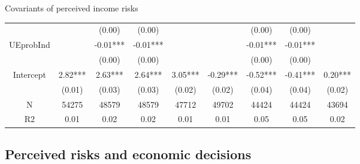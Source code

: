 \documentclass{beamer}
\begin{document}
\begin{frame}{Covariants of perceived income risks}
\begin{table}
{\begin{tabular}{ccccccccc}
	&           &    (0.00) &     (0.00) &             &           &     (0.00) &      (0.00) &              \\
	UEprobInd        &           &  -0.01*** &   -0.01*** &             &           &   -0.01*** &    -0.01*** &              \\
	&           &    (0.00) &     (0.00) &             &           &     (0.00) &      (0.00) &              \\
	Intercept        &   2.82*** &   2.63*** &    2.64*** &     3.05*** &  -0.29*** &   -0.52*** &    -0.41*** &      0.20*** \\
	&    (0.01) &    (0.03) &     (0.03) &      (0.02) &    (0.02) &     (0.04) &      (0.04) &       (0.02) \\           
	\hline 
	N                &     54275 &     48579 &      48579 &       47712 &     49702 &      44424 &       44424 &        43694 \\
	R2               &      0.01 &      0.02 &       0.02 &        0.01 &      0.01 &       0.05 &        0.05 &         0.02 \\
	\hline 
\end{tabular}	
}
	\end{table}
\end{frame}


\subsection{Perceived risks and economic decisions}
\end{document}
